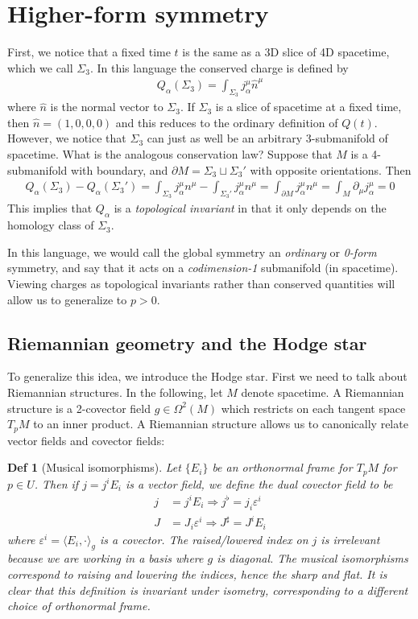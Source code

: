 \documentclass[11pt]{article}
\newtheorem{defn}{Def}
\renewcommand{\epsilon}{\varepsilon}
\begin{document}
\section{Higher-form symmetry}
First, we notice that a fixed time $t$ is the same as a 3D slice of 4D
spacetime, which we call $\Sigma_3$. In this language the conserved charge is
defined by
\begin{align}\label{eq:ordinary_charge}
  Q_\alpha(\Sigma_3) = \int_{\Sigma_3} j_\alpha^\mu \hat n^\mu 
\end{align}
where $\hat n$ is the normal vector to $\Sigma_3$. If $\Sigma_3$ is a slice of
spacetime at a fixed time, then $\hat n = (1,0,0,0)$ and this reduces to the
ordinary definition of $Q(t)$. However, we notice that $\Sigma_3$ can just as
well be an arbitrary 3-submanifold of spacetime. What is the
analogous conservation law? Suppose that $M$ is a 4-submanifold with boundary, and $\partial M = \Sigma_3 \sqcup \Sigma_3'$ with
opposite orientations. Then
\begin{align}
Q_\alpha(\Sigma_3) - Q_\alpha(\Sigma_3') = \int_{\Sigma_3}j_\alpha^\mu n^\mu - \int_{\Sigma_3'}j_\alpha^\mu n^\mu = \int_{\partial M}j_\alpha^\mu n^\mu = \int_{M}\partial_\mu j_\alpha^\mu = 0
\end{align}
This implies that $Q_{\alpha}$ is a \emph{topological invariant} in that it only
depends on the homology class of $\Sigma_3$.

In this language, we would call the global symmetry an \emph{ordinary} or
\emph{0-form} symmetry, and say that it acts on a \emph{codimension-1}
submanifold (in spacetime). Viewing charges as topological
invariants rather than conserved quantities will allow us to generalize to $p >
0$. 

\subsection{Riemannian geometry and the Hodge star}
To generalize this idea, we introduce the Hodge star. First we need to talk
about Riemannian structures. In the following, let $M$ denote spacetime.
A Riemannian structure is a 2-covector field $g \in \Omega^2(M)$ which restricts
on each tangent space $T_pM$ to an inner product.
A Riemannian structure allows us to canonically relate vector fields and
covector fields:
\begin{defn}[Musical isomorphisms]
  Let $\{E_i\}$ be an orthonormal frame for $T_pM$ for $p \in U$.
  Then if $j = j^i E_i$ is a vector field, we define the dual covector
  field to be
  \begin{align}
    j &= j^i E_i \Rightarrow j^\flat = j_i \epsilon^i \\
    J &= J_i \epsilon^i \Rightarrow J^\sharp = J^iE_i
  \end{align}
  where $\epsilon^i = \langle E_i, \cdot \rangle_g$ is a covector.
  The raised/lowered index on $j$ is irrelevant because we are working in a
  basis where $g$ is diagonal. The musical isomorphisms correspond to raising
  and lowering the indices, hence the sharp and flat. It is clear that this
  definition is invariant under isometry, corresponding to a different choice of
  orthonormal frame.
\end{defn}
\end{document}
